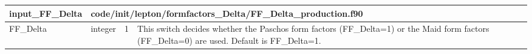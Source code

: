 \documentclass{article}
\begin{document}

\begin{longtable}{llll}
\toprule
\textbf{\large{input\_FF\_Delta}} & \multicolumn{3}{l}{\footnotesize{code/init/lepton/formfactors\_Delta/FF\_Delta\_production.f90}}\\*
\midrule
\endfirsthead
\midrule
\endhead
FF\_Delta & \begin{minipage}[t]{2cm}integer\end{minipage} & \begin{minipage}[t]{2cm}1\end{minipage} & \begin{minipage}[t]{12cm}This switch decides whether the Paschos form factors (FF\_Delta=1) or the Maid form factors (FF\_Delta=0) are used. Default is FF\_Delta=1.\end{minipage}\\*
\bottomrule
\end{longtable}
{ }



\end{document}
